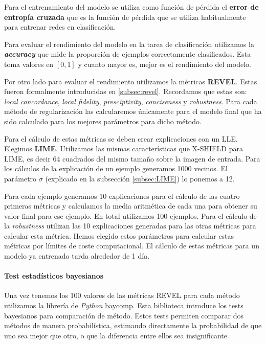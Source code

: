 Para el entrenamiento del modelo se utiliza como función de pérdida el \textbf{error de entropía cruzada} que es la función de pérdida que se utiliza habitualmente para entrenar redes en clasificación.

Para evaluar el rendimiento del modelo en la tarea de clasificación utilizamos la \textbf{\textit{accuracy}} que mide la proporción de ejemplos correctamente clasificados. Esta toma valores en $[0,1]$ y cuanto mayor es, mejor es el rendimiento del modelo. 

Por otro lado para evaluar el rendimiento utilizamos la métricas \textbf{REVEL}. Estas fueron formalmente introducidas en \ref{subsec:revel}. Recordamos que estas son: \textit{local concordance}, \textit{local fidelity}, \textit{presciptivity}, \textit{conciseness} y \textit{robustness}. Para cada método de regularización las calcularemos únicamente para el modelo final que ha sido calculado para los mejores parámetros para dicho método.

Para el cálculo de estas métricas se deben crear explicaciones con un LLE. Elegimos \textbf{LIME}. Utilizamos las mismas características que X-SHIELD para LIME, es decir 64 cuadrados del mismo tamaño sobre la imagen de entrada.  Para los cálculos de la explicación de un ejemplo generamos 1000 vecinos. El parámetro $\sigma$ (explicado en la subsección \ref{subsec:LIME}) lo ponemos a 12.

Para cada ejemplo generamos 10 explicaciones para el cálculo de las cuatro primeras métricas y calculamos la media aritmética de cada una para obtener su valor final para ese ejemplo. En total utilizamos 100 ejemplos. Para el cálculo de la \textit{robustness} utilizan las 10 explicaciones generadas para las otras métricas para calcular esta métrica. Hemos elegido estos parámetros para calcular estas métricas por límites de coste computacional. El cálculo de estas métricas para un modelo ya entrenado tarda alrededor de 1 día.


\paragraph*{Test estadísticos bayesianos}

Una vez tenemos los 100 valores de las métricas REVEL para cada método utilizamos la librería de \textit{Python} \href{https://baycomp.readthedocs.io/en/latest/\#baycomp}{baycomp}. Esta biblioteca introduce los tests bayesianos para comparación de método. Estos tests permiten comparar dos métodos de manera probabilística, estimando directamente la probabilidad de que uno sea mejor que otro, o que la diferencia entre ellos sea insignificante.

